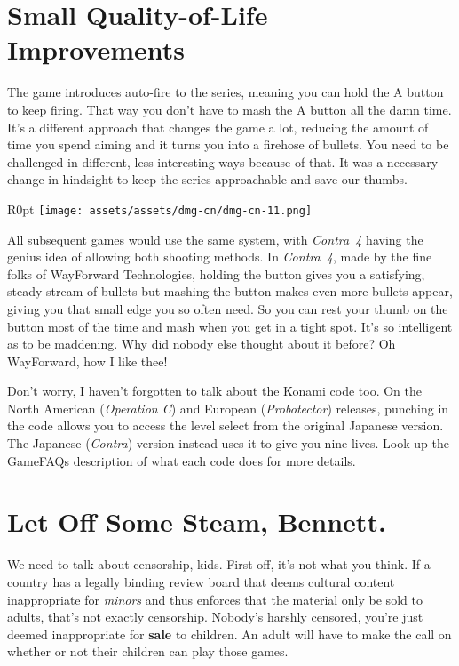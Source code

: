 \documentclass{book}
\begin{document}
\FloatBarrier\needspace{10mm}\section*{Small Quality-of-Life Improvements}\nopagebreak[4]

The game introduces auto-fire to the series, meaning you can hold the A button to keep firing. That way you don’t have to mash the A button all the damn time. It’s a different approach that changes the game a lot, reducing the amount of time you spend aiming and it turns you into a firehose of bullets. You need to be challenged in different, less interesting ways because of that. It was a necessary change in hindsight to keep the series approachable and save our thumbs.

\begin{wrapfigure}{R}{0pt} \texttt{[image: assets/assets/dmg-cn/dmg-cn-11.png]}\end{wrapfigure}
All subsequent games would use the same system, with \emph{Contra 4} having the genius idea of allowing both shooting methods. In \emph{Contra 4}, made by the fine folks of WayForward Technologies, holding the button gives you a satisfying, steady stream of bullets but mashing the button makes even more bullets appear, giving you that small edge you so often need. So you can rest your thumb on the button most of the time and mash when you get in a tight spot. It’s so intelligent as to be maddening. Why did nobody else thought about it before? Oh WayForward, how I like thee!

Don’t worry, I haven’t forgotten to talk about the Konami code too. On the North American (\emph{Operation C}) and European (\emph{Probotector}) releases, punching in the code allows you to access the level select from the original Japanese version. The Japanese (\emph{Contra}) version instead uses it to give you nine lives. Look up the GameFAQs description of what each code does for more details.

\FloatBarrier\needspace{10mm}\section*{Let Off Some Steam, Bennett.}\nopagebreak[4]

We need to talk about censorship, kids. First off, it’s not what you think. If a country has a legally binding review board that deems cultural content inappropriate for \emph{minors} and thus enforces that the material only be sold to adults, that’s not exactly censorship. Nobody’s harshly censored, you’re just deemed inappropriate for \textbf{sale} to children. An adult will have to make the call on whether or not their children can play those games.
\end{document}
